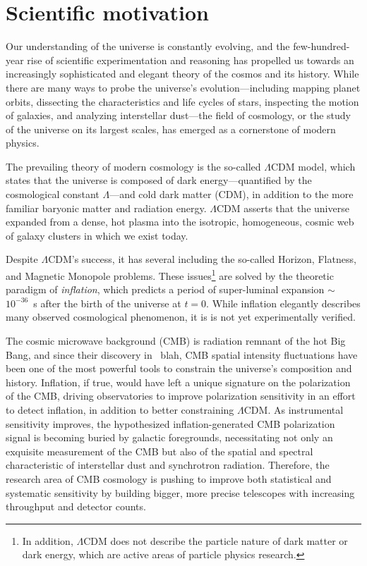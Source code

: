 \chapter{Scientific motivation}
\label{ch:scientific_motivation}

Our understanding of the universe is constantly evolving, and the few-hundred-year rise of scientific experimentation and reasoning has propelled us towards an increasingly sophisticated and elegant theory of the cosmos and its history. While there are many ways to probe the universe's evolution---including mapping planet orbits, dissecting the characteristics and life cycles of stars, inspecting the motion of galaxies, and analyzing interstellar dust---the field of cosmology, or the study of the universe on its largest scales, has emerged as a cornerstone of modern physics.

The prevailing theory of modern cosmology is the so-called $\Lambda$CDM model, which states that the universe is composed of dark energy---quantified by the cosmological constant $\Lambda$---and cold dark matter (CDM), in addition to the more familiar baryonic matter and radiation energy. $\Lambda$CDM asserts that the universe expanded from a dense, hot plasma into the isotropic, homogeneous, cosmic web of galaxy clusters in which we exist today.

Despite $\Lambda$CDM's success, it has several including the so-called Horizon, Flatness, and Magnetic Monopole problems. These issues\footnote{In addition, $\Lambda$CDM does not describe the particle nature of dark matter or dark energy, which are active areas of particle physics research.} are solved by the theoretic paradigm of \textit{inflation}, which predicts a period of super-luminal expansion $\sim$~$10^{-36}$~s after the birth of the universe at $t = 0$. While inflation elegantly describes many observed cosmological phenomenon, it is is not yet experimentally verified. 

The cosmic microwave background (CMB) is radiation remnant of the hot Big Bang, and since their discovery in ~blah, CMB spatial intensity fluctuations have been one of the most powerful tools to constrain the universe's composition and history. Inflation, if true, would have left a unique signature on the polarization of the CMB, driving observatories to improve polarization sensitivity in an effort to detect inflation, in addition to better constraining $\Lambda$CDM. As instrumental sensitivity improves, the hypothesized inflation-generated CMB polarization signal is becoming buried by galactic foregrounds, necessitating not only an exquisite measurement of the CMB but also of the spatial and spectral characteristic of interstellar dust and synchrotron radiation. Therefore, the research area of CMB cosmology is pushing to improve both statistical and systematic sensitivity by building bigger, more precise telescopes with increasing throughput and detector counts.

